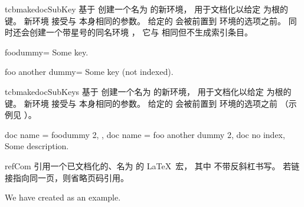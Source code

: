 \clearpage
\begin{docCommand}[doc updated=2023-12-01]{tcbmakedocSubKey}{}
  基于  创建一个名为  的新环境，
  用于文档化以给定  为根的键。
  新环境  接受与  本身相同的参数。
  给定的  会被前置到  环境的选项之前。
  同时还会创建一个带星号的同名环境 ，
  它与  相同但不生成索引条目。
\begin{dispExample}

\begin{docFooKey}{foodummy}{=}{\tcbdocdescDefaultInitEmpty}
Some key.
\end{docFooKey}

\begin{docFooKey*}{foo another dummy}{=}{\tcbdocdescDefaultInitEmpty}
Some key (not indexed).
\end{docFooKey*}
\end{dispExample}
\end{docCommand}


\begin{docCommand}[doc new and updated={2020-04-22}{2023-12-01}]{tcbmakedocSubKeys}{}
  基于  创建一个名为  的新环境，
  用于文档化以给定  为根的键。
  新环境  接受与  本身相同的参数。
  给定的  会被前置到  环境的选项之前
  （示例见 ）。
\begin{dispExample}

\begin{docFooKeys}[
    doc parameter eq meta = nothing,
    doc description init empty,
  ]
  {
    {
      doc name = foodummy 2,
    },
    {
      doc name = foo another dummy 2,
      doc no index,
    }
  }
Some description.
\end{docFooKeys}
\end{dispExample}
\end{docCommand}


\clearpage

\begin{docCommand}{refCom}{}
  引用一个已文档化的、名为  的 \LaTeX\ 宏，
  其中  不带反斜杠书写。
  若链接指向同一页，则省略页码引用。
\begin{dispExample}
We have created  as an example.
\end{dispExample}
\end{docCommand}

